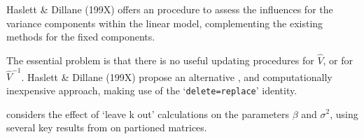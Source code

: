 
Haslett \& Dillane (199X) offers an
procedure to assess the influences for the variance components
within the linear model, complementing the existing methods for
the fixed components. 


The essential problem is that there is no
useful updating procedures for $\hat{V}$, or for $\hat{V}^{-1}$.
Haslett \& Dillane (199X) propose an alternative , and
computationally inexpensive approach, making use of the
`\texttt{delete=replace}' identity.

\citet{Haslett99} considers the effect of `leave k out'
calculations on the parameters $\beta$ and $\sigma^{2}$, using
several key results from \citet{HaslettHayes} on partioned
matrices.


